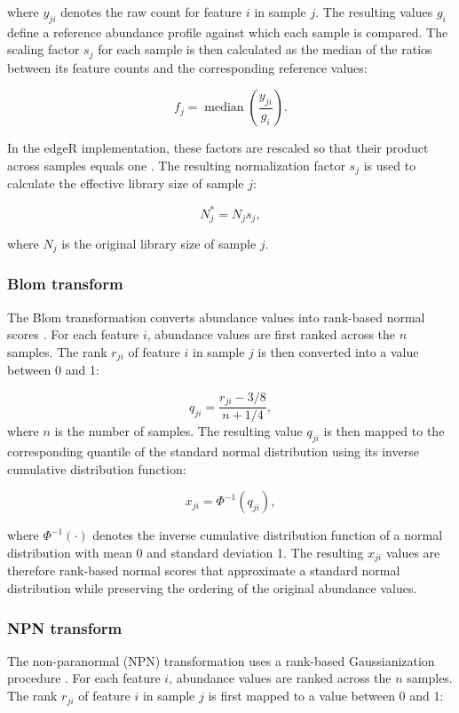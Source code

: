 \begin{bibunit}[apalike]
\begin{appendices}
where $y_{ji}$ denotes the raw count for feature $i$ in sample $j$. The resulting values $g_i$ define a reference abundance profile against which each sample is compared. The scaling factor $s_j$ for each sample is then calculated as the median of the ratios between its feature counts and the corresponding reference values:

$$
f_j={\operatorname{median}}\left(\frac{y_{ji}}{g_i}\right).
$$

In the edgeR implementation, these factors are rescaled so that their product across samples equals one \citep{robinson_edger_2010}. The resulting normalization factor $s_j$ is used to calculate the effective library size of sample $j$:

$$
N_j^{*}=N_j s_j,
$$

where $N_j$ is the original library size of sample $j$.





\subsubsection*{Blom transform}


The Blom transformation converts abundance values into rank-based normal scores \cite{blom_statistical_1958}. For each feature $i$, abundance values are first ranked across the $n$ samples. The rank $r_{ji}$ of feature $i$ in sample $j$ is then converted into a value between 0 and 1:


\[
q_{ji}=\frac{r_{ji}-3/8}{n+1/4},
\]
where $n$ is the number of samples. The resulting value $q_{ji}$ is then mapped to the corresponding quantile of the standard normal distribution using its inverse cumulative distribution function:

\[
x_{ji}=\Phi^{-1}(q_{ji}),
\]

where $\Phi^{-1}(\cdot)$ denotes the inverse cumulative distribution function of a normal distribution with mean 0 and standard deviation 1. The resulting $x_{ji}$ values are therefore rank-based normal scores that approximate a standard normal distribution while preserving the ordering of the original abundance values.


\subsubsection*{NPN transform}

The non-paranormal (NPN) transformation uses a rank-based Gaussianization procedure \citep{liu_nonparanormal_2009}. For each feature $i$, abundance values are ranked across the $n$ samples. The rank $r_{ji}$ of feature $i$ in sample $j$ is first mapped to a value between 0 and 1:


\end{appendices}
\end{bibunit}
